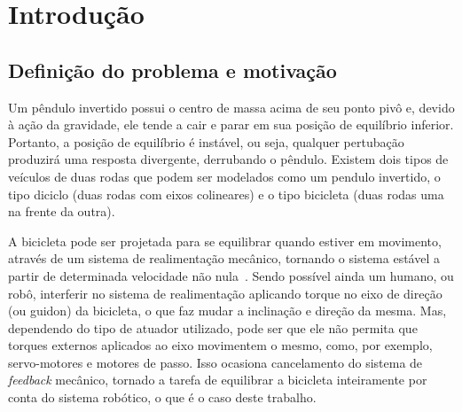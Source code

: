\chapter{Introdução}    %
    \label{chp:introducao}
    \section{Definição do problema e motivação}
        
        
        Um pêndulo invertido possui o centro de massa acima de seu ponto pivô e, devido à ação da gravidade, ele tende a cair e parar em sua posição de equilíbrio inferior. Portanto, a posição de equilíbrio é instável, ou seja, qualquer pertubação produzirá uma resposta divergente, derrubando o pêndulo. Existem dois tipos de veículos de duas rodas que podem ser modelados como um pendulo invertido, o tipo diciclo (duas rodas com eixos colineares) e o tipo bicicleta (duas rodas uma na frente da outra). %
        
        A bicicleta pode ser projetada para se equilibrar quando estiver em movimento, através de um sistema de realimentação mecânico, tornando o sistema estável a partir de determinada velocidade não nula~\cite{book:astom}. Sendo possível ainda um humano, ou robô, interferir no sistema de realimentação aplicando torque no eixo de direção (ou guidon) da bicicleta, o que faz mudar a inclinação e direção da mesma. Mas, dependendo do tipo de atuador utilizado, pode ser que ele não permita que torques externos aplicados ao eixo movimentem o mesmo, como, por exemplo, servo-motores e motores de passo. Isso ocasiona cancelamento do sistema de \textit{feedback} mecânico, tornado a tarefa de equilibrar a bicicleta inteiramente por conta do sistema robótico, o que é o caso deste trabalho.
        
